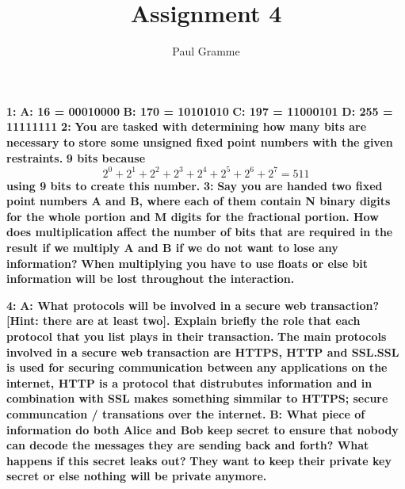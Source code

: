 \documentclass[12pt]{article}
\author{Paul Gramme}
\begin{document}
%
%
\title{Assignment 4}
\maketitle{}
%
%
\noindent \textbf{1:}
%
%
\newline
\textbf{A: 16 \space = 00010000 }
\newline
\textbf{B: 170 = 10101010 }
\newline
\textbf{C: 197 = 11000101 }
\newline
\textbf{D: 255 = 11111111 }
%
%
\newline
\vfill
\noindent \textbf{2:}
%
%
\newline
\textbf{You are tasked with determining how many bits are necessary to store some unsigned fixed point numbers with the given restraints.}
\vfill
\textbf{9 bits because \[2^0+2^1+2^2+2^3+2^4+2^5+2^6+2^7 = 511\] using 9 bits to create this number. }
\newline
%
%
\vfill
\noindent \textbf{3:}
%
%
\newline
\textbf{Say you are handed two fixed point numbers A and B, where each of them contain N binary digits for the whole portion and M digits for the fractional portion.  How does multiplication affect the number of bits that are required in the result if we multiply A and B if we do not want to lose any information?}
\vfill
\textbf{When multiplying you have to use floats or else bit information will be lost throughout the interaction. }
\newline
\vfill \vfill
%
%

\newpage
\noindent \textbf{4:}
%
%
\newline
\textbf{A: What protocols will be involved in a secure web transaction?  [Hint: there are at least two]. Explain briefly the role that each protocol that you list plays in their transaction.}
\vfill
\textbf{The main protocols involved in a secure web transaction are HTTPS, HTTP and SSL.SSL is used for securing communication between any applications on the internet, HTTP is a protocol that distrubutes information and in combination with SSL makes something simmilar to HTTPS; secure communcation / transations over the internet.  }
\vfill
\noindent \textbf{B: What piece of information do both Alice and Bob keep secret to ensure that nobody can decode the messages they are sending back and forth?  What happens if this secret leaks out? }
\vfill
\textbf{They want to keep their private key secret or else nothing will be private anymore. }
\vfill \vfill \vfill \vfill \vfill \vfill \vfill \vfill \vfill
\end{document}
